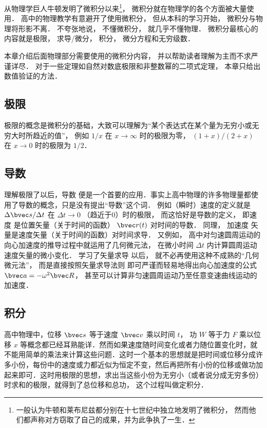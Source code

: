 
从物理学巨人牛顿发明了微积分以来\footnote{一般认为牛顿和莱布尼兹都分别在十七世纪中独立地发明了微积分， 然而他们都声称对方窃取了自己的成果，并为此争执了一生．}， 微积分就在物理学的各个方面被大量使用． 高中的物理教学有意避开了使用微积分， 但从本科的学习开始， 微积分与物理将形影不离． 不夸张地说， 不懂微积分， 就几乎不懂物理． 微积分最核心的内容就是极限， 求导/微分， 积分， 微分方程和无穷级数．

本章介绍后面物理部分需要使用的微积分内容， 并以帮助读者理解为主而不求严谨详尽． 对于一些定理如自然对数底极限和非整数幂的二项式定理， 本章只给出数值验证的方法．

\subsection{极限}
极限的概念是微积分的基础，大致可以理解为“某个表达式在某个量为无穷小或无穷大时所趋近的值”， 例如 $1/x$ 在 $x\to\infty$ 时的极限为零， $(1+x)/(2+x)$ 在 $x\to 0$ 时的极限为 $1/2$． 

\subsection{导数}
理解极限了以后，导数 便是一个首要的应用．事实上高中物理的许多物理量都使用了导数的概念，只是没有提出“导数”这个词． 例如（瞬时）速度的定义就是 $\Delta\bvec s/\Delta t$ 在 $\Delta t \to 0$ （趋近于0）时的极限， 而这恰好是导数的定义， 即速度%
是位置矢量（关于时间的函数） $\bvec r(t)$ 对时间的导数． 同理， 加速度%
矢量是速度矢量（关于时间的函数）对时间求导． 又例如， 高中对匀速圆周运动的向心加速度的推导过程中就运用了几何微元法， 在微小时间 $\Delta t$ 内计算圆周运动速度矢量的微小变化． 学习了矢量求导 以后， 就不必再使用这种不成熟的“几何微元法”， 而是直接按照矢量求导法则 即可严谨而轻易地得出向心加速度的公式 $\bvec a = -\omega^2 \bvec R$， 甚至可以计算非匀速圆周运动乃至任意变速曲线运动的加速度．

\subsection{积分}
高中物理中，位移 $\bvec s$ 等于速度 $\bvec v$ 乘以时间 $t$， 功 $W$ 等于力 $F$ 乘以位移 $x$ 等概念都已经耳熟能详．然而如果速度随时间变化或者力随位置变化时，就不能用简单的乘法来计算这些问题．这时一个基本的思想就是把时间或位移分成许多小份，每份中的速度或力都近似为恒定不变，然后再把所有小份的位移或做功加起来即可．这时用极限的思想，求出当这些小份为无穷小（或者说分成无穷多份）时求和的极限，就得到了总位移和总功， 这个过程叫做定积分． %

